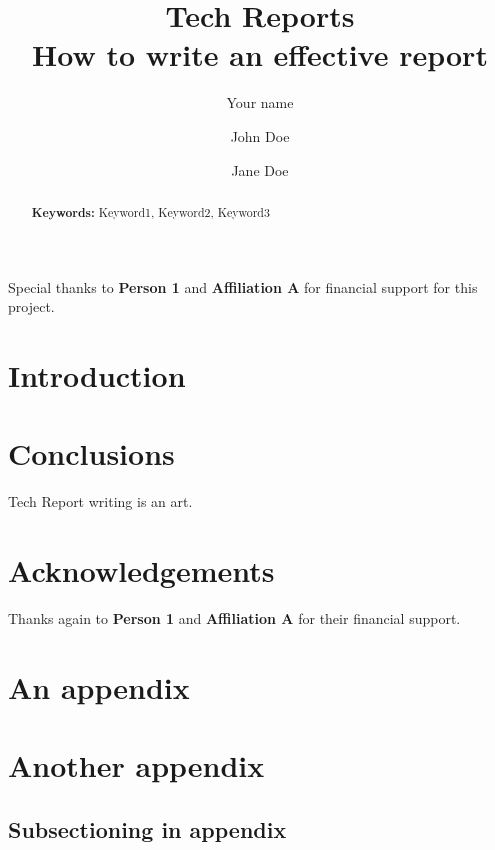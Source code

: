 \documentclass[12pt, letterpaper, twoside]{article}
\date{}
\title{\textbf{Tech Reports\\How to write an effective report}} %
\author{Your name \and John Doe \and Jane Doe} %
\providecommand{\keywords}[1]{\noindent \textbf{Keywords:} #1} %
\begin{document}
\maketitle

\begin{abstract}
    \noindent
    \blindtext[1]

    \keywords{Keyword1, Keyword2, Keyword3}
\end{abstract}

\vspace{2.5cm}

{\footnotesize
    \noindent
    Special thanks to \textbf{Person 1} and \textbf{Affiliation A} for financial support for this project.
}

\thispagestyle{firstpage}

\pagebreak

\setlength{\parindent}{1.5em} %
\newgeometry{} %

\section{Introduction}
\label{sec:intro}

\blindmathpaper

\section{Conclusions}
\label{sec:conc}

Tech Report writing is an art.

\section*{Acknowledgements}

Thanks again to \textbf{Person 1} and \textbf{Affiliation A} for their financial support.

% 
% 

\appendix

\section{An appendix}


\blindtext

\section{Another appendix}

\subsection*{Subsectioning in appendix}

\blindenumerate
\end{document}
